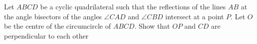 Let $ABCD$ be a cyclic quadrilateral such that the reflections of the lines $AB$ at the
angle bisectors of the angles $\angle CAD$ and $\angle CBD$ intersect at a point $P$.
Let $O$ be the centre of the circumcircle of $ABCD$.
Show that $OP$ and $CD$ are perpendicular to each other